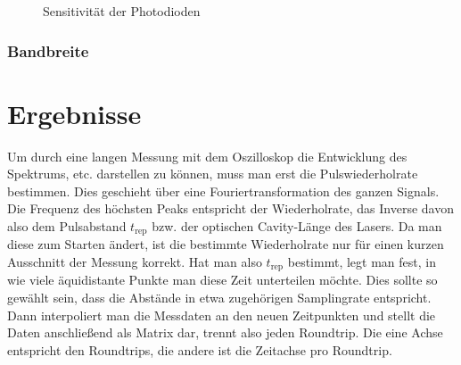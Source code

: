 \documentclass[bachelor,       %
               twoside,        %
               BCOR10mm,       %
               english,ngerman, %
               ]{GAUBM}
\begin{document}
\begin{figure}[!htb]
	\centering
   \hfill
	\caption{Sensitivität der Photodioden}
	\label{fig:PDsens}
\end{figure}


\subsection{Bandbreite}

\chapter{Ergebnisse}
Um durch eine langen Messung mit dem Oszilloskop die Entwicklung des Spektrums, etc. darstellen zu können, muss man erst die Pulswiederholrate bestimmen.
Dies geschieht über eine Fouriertransformation des ganzen Signals.
Die Frequenz des höchsten Peaks entspricht der Wiederholrate, das Inverse davon also dem Pulsabstand $t_\text{rep}$ bzw. der optischen Cavity-Länge des Lasers.
Da man diese zum Starten ändert, ist die bestimmte Wiederholrate nur für einen kurzen Ausschnitt der Messung korrekt.
Hat man also $t_\text{rep}$ bestimmt, legt man fest, in wie viele äquidistante Punkte man diese Zeit unterteilen möchte.
Dies sollte so gewählt sein, dass die Abstände in etwa zugehörigen Samplingrate entspricht.
Dann interpoliert man die Messdaten an den neuen Zeitpunkten und stellt die Daten anschließend als Matrix dar, trennt also jeden Roundtrip.
Die eine Achse entspricht den Roundtrips, die andere ist die Zeitachse pro Roundtrip.
\end{document}
